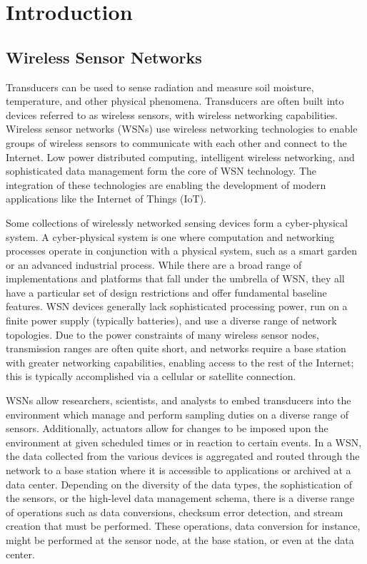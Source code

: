 
\chapter{Introduction} %
\label{Chapter 1}
\lhead{} %

\section{Wireless Sensor Networks}

Transducers can be used to sense radiation and measure soil moisture, temperature, and other physical phenomena. Transducers are often built into devices referred to as wireless sensors, with wireless networking capabilities. Wireless sensor networks (WSNs) use wireless networking technologies to enable groups of wireless sensors to communicate with each other and connect to the Internet. Low power distributed computing, intelligent wireless networking, and sophisticated data management form the core of WSN technology. The integration of these technologies are enabling the development of modern applications like the Internet of Things (IoT).

Some collections of wirelessly networked sensing devices form a cyber-physical system. A cyber-physical system is one where computation and networking processes operate in conjunction with a physical system, such as a smart garden or an advanced industrial process. While there are a broad range of implementations and platforms that fall under the umbrella of WSN, they all have a particular set of design restrictions and offer fundamental baseline features. WSN devices generally lack sophisticated processing power, run on a finite power supply (typically batteries), and use a diverse range of network topologies. Due to the power constraints of many wireless sensor nodes, transmission ranges are often quite short, and networks require a base station with greater networking capabilities, enabling access to the rest of the Internet; this is  typically accomplished via a cellular or satellite connection. 

WSNs allow researchers, scientists, and analysts to embed transducers into the environment which manage and perform sampling duties on a diverse range of sensors. Additionally, actuators allow for changes to be imposed upon the environment at given scheduled times or in reaction to certain events. In a WSN, the data collected from the various devices is aggregated and routed through the network to a base station where it is accessible to applications or archived at a data center. Depending on the diversity of the data types, the sophistication of the sensors, or the high-level data management schema, there is a diverse range of operations such as data conversions, checksum error detection, and stream creation that must be performed. These operations, data conversion for instance, might be performed at the sensor node, at the base station, or even at the data center. 

